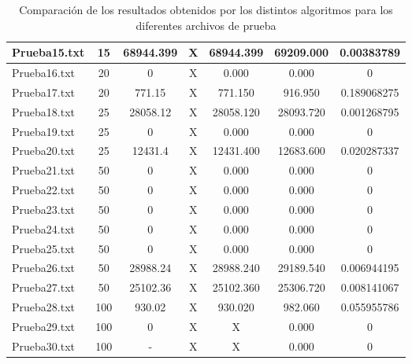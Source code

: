 \documentclass[11pt,letter]{article}
\begin{document}
\begin{table}[H]
\begin{adjustbox}{width=\textwidth}
\begin{tabular}{|l|c|c|c|c|c|c|}
\hline
Prueba15.txt & 15 & 68944.399 & \cellcolor{rosado}X & \cellcolor{verde}68944.399 & \cellcolor{rosado}69209.000 & 0.00383789 \\
\hline
Prueba16.txt & 20 & 0 & \cellcolor{rosado}X & \cellcolor{verde}0.000 & \cellcolor{verde}0.000 & 0 \\
\hline
Prueba17.txt & 20 & 771.15 & \cellcolor{rosado}X & \cellcolor{verde}771.150 & \cellcolor{rosado}916.950 & 0.189068275 \\
\hline
Prueba18.txt & 25 & 28058.12 & \cellcolor{rosado}X & \cellcolor{verde}28058.120 & \cellcolor{rosado}28093.720 & 0.001268795 \\
\hline
Prueba19.txt & 25 & 0 & \cellcolor{rosado}X & \cellcolor{verde}0.000 & \cellcolor{verde}0.000 & 0 \\
\hline
Prueba20.txt & 25 & 12431.4 & \cellcolor{rosado}X & \cellcolor{verde}12431.400 & \cellcolor{rosado}12683.600 & 0.020287337 \\
\hline
Prueba21.txt & 50 & 0 & \cellcolor{rosado}X & \cellcolor{verde}0.000 & \cellcolor{verde}0.000 & 0 \\
\hline
Prueba22.txt & 50 & 0 & \cellcolor{rosado}X & \cellcolor{verde}0.000 & \cellcolor{verde}0.000 & 0 \\
\hline
Prueba23.txt & 50 & 0 & \cellcolor{rosado}X & \cellcolor{verde}0.000 & \cellcolor{verde}0.000 & 0 \\
\hline
Prueba24.txt & 50 & 0 & \cellcolor{rosado}X & \cellcolor{verde}0.000 & \cellcolor{verde}0.000 & 0 \\
\hline
Prueba25.txt & 50 & 0 & \cellcolor{rosado}X & \cellcolor{verde}0.000 & \cellcolor{verde}0.000 & 0 \\
\hline
Prueba26.txt & 50 & 28988.24 & \cellcolor{rosado}X & \cellcolor{verde}28988.240 & \cellcolor{rosado}29189.540 & 0.006944195 \\
\hline
Prueba27.txt & 50 & 25102.36 & \cellcolor{rosado}X & \cellcolor{verde}25102.360 & \cellcolor{rosado}25306.720 & 0.008141067 \\
\hline
Prueba28.txt & 100 & 930.02 & \cellcolor{rosado}X & \cellcolor{verde}930.020 & \cellcolor{rosado}982.060 & 0.055955786 \\
\hline
Prueba29.txt & 100 & 0 & \cellcolor{rosado}X & \cellcolor{rosado}X & \cellcolor{verde}0.000 & 0 \\
\hline
Prueba30.txt & 100 & - & \cellcolor{rosado}X & \cellcolor{rosado}X & \cellcolor{verde}0.000 & 0 \\
\hline
\end{tabular}
\end{adjustbox}
\caption{Comparación de los resultados obtenidos por los distintos algoritmos para los diferentes archivos de prueba}
\end{table}
\end{document}
